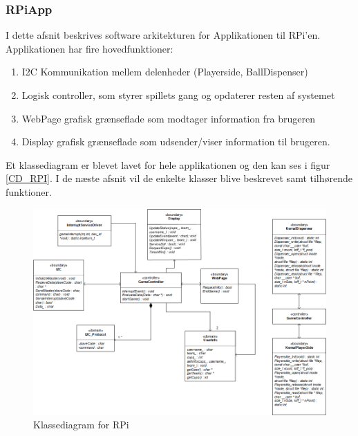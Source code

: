 \documentclass[Arkitektur/System_main.tex]{subfiles}
\begin{document}
\subsubsection{RPiApp}
I dette afsnit beskrives software arkitekturen for Applikationen til RPi'en. Applikationen har fire hovedfunktioner:
\begin{enumerate}
    \item I2C Kommunikation mellem delenheder (Playerside, BallDispenser)
    \item Logisk controller, som styrer spillets gang og opdaterer resten af systemet
    \item WebPage grafisk grænseflade som modtager information fra brugeren
    \item Display grafisk grænseflade som udsender/viser information til brugeren. 
\end{enumerate}
Et klassediagram er blevet lavet for hele applikationen og den kan ses i figur \ref{CD_RPI}. I de næste afsnit vil de enkelte klasser blive beskrevet samt tilhørende funktioner. 

\begin{figure}[H]
    \centering
    \includegraphics[width=\textwidth]{Arkitektur/Softwarearkitektur/Applikationsmodel/RPi/graphics_RPi/Class.png}
    \caption{Klassediagram for RPi}
    \label{fig:CD_RPI}
\end{figure}
\end{document}
